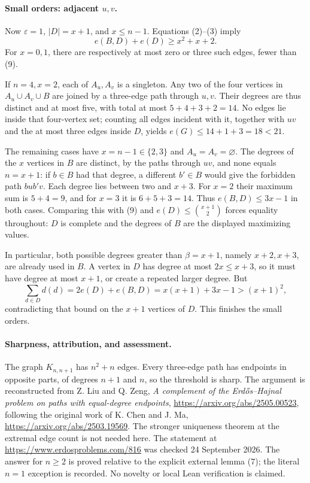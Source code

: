 \paragraph{Small orders: adjacent \(u,v\).}
Now \(\varepsilon=1\), \(|D|=x+1\), and \(x\leq n-1\). Equations (2)--(3) imply
\[
 e(B,D)+e(D)\geq x^2+x+2.
\tag{9}
\]
For \(x=0,1\), there are respectively at most zero or three such edges, fewer than (9).

If \(n=4,x=2\), each of \(A_u,A_v\) is a singleton. Any two of the four vertices in \(A_u\cup A_v\cup B\) are joined by a three-edge path through \(u,v\). Their degrees are thus distinct and at most five, with total at most \(5+4+3+2=14\). No edges lie inside that four-vertex set; counting all edges incident with it, together with \(uv\) and the at most three edges inside \(D\), yields \(e(G)\leq14+1+3=18<21\).

The remaining cases have \(x=n-1\in\{2,3\}\) and \(A_u=A_v=\varnothing\). The degrees of the \(x\) vertices in \(B\) are distinct, by the paths through \(uv\), and none equals \(n=x+1\): if \(b\in B\) had that degree, a different \(b'\in B\) would give the forbidden path \(bub'v\). Each degree lies between two and \(x+3\). For \(x=2\) their maximum sum is \(5+4=9\), and for \(x=3\) it is \(6+5+3=14\). Thus
\(e(B,D)\leq3x-1\) in both cases. Comparing this with (9) and \(e(D)\leq\binom{x+1}{2}\) forces equality throughout: \(D\) is complete and the degrees of \(B\) are the displayed maximizing values.

In particular, both possible degrees greater than \(\beta=x+1\), namely \(x+2,x+3\), are already used in \(B\). A vertex in \(D\) has degree at most \(2x\leq x+3\), so it must have degree at most \(x+1\), or create a repeated larger degree. But
\[
 \sum_{d\in D}d(d)=2e(D)+e(B,D)
 =x(x+1)+3x-1>(x+1)^2,
\]
contradicting that bound on the \(x+1\) vertices of \(D\). This finishes the small orders.

\paragraph{Sharpness, attribution, and assessment.}
The graph \(K_{n,n+1}\) has \(n^2+n\) edges. Every three-edge path has endpoints in opposite parts, of degrees \(n+1\) and \(n\), so the threshold is sharp. The argument is reconstructed from Z. Liu and Q. Zeng, \emph{A complement of the Erd\H{o}s--Hajnal problem on paths with equal-degree endpoints}, \url{https://arxiv.org/abs/2505.00523}, following the original work of K. Chen and J. Ma, \url{https://arxiv.org/abs/2503.19569}. The stronger uniqueness theorem at the extremal edge count is not needed here. The statement at \url{https://www.erdosproblems.com/816} was checked 24 September 2026. The answer for \(n\geq2\) is proved relative to the explicit external lemma (7); the literal \(n=1\) exception is recorded. No novelty or local Lean verification is claimed.
